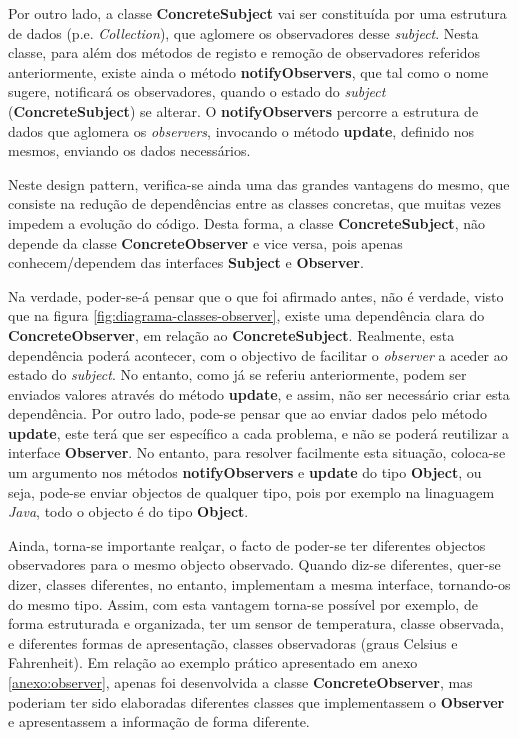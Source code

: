 \hspace{2mm} Por outro lado, a classe \textbf{ConcreteSubject} vai ser constituída por uma estrutura de dados (p.e. \textit{Collection}), que aglomere os observadores desse \textit{subject}. Nesta classe, para além dos métodos de registo e remoção de observadores referidos anteriormente, existe ainda o método \textbf{notifyObservers}, que tal como o nome sugere, notificará os observadores, quando o estado do \textit{subject} (\textbf{ConcreteSubject}) se alterar. O \textbf{notifyObservers} percorre a estrutura de dados que aglomera os \textit{observers}, invocando o método \textbf{update}, definido nos mesmos, enviando os dados necessários.

\hspace{2mm} Neste design pattern, verifica-se ainda uma das grandes vantagens do mesmo, que consiste na redução de dependências entre as classes concretas, que muitas vezes impedem a evolução do código. Desta forma, a classe \textbf{ConcreteSubject}, não depende da classe \textbf{ConcreteObserver} e vice versa, pois apenas conhecem/dependem das interfaces \textbf{Subject} e \textbf{Observer}. 

\hspace{2mm} Na verdade, poder-se-á pensar que o que foi afirmado antes, não é verdade, visto que na figura \ref{fig:diagrama-classes-observer}, existe uma dependência clara do \textbf{ConcreteObserver}, em relação ao \textbf{ConcreteSubject}. Realmente, esta dependência poderá acontecer, com o objectivo de facilitar o \textit{observer} a aceder ao estado do \textit{subject}. No entanto, como já se referiu anteriormente, podem ser enviados valores através do método \textbf{update}, e assim, não ser necessário criar esta dependência. Por outro lado, pode-se pensar que ao enviar dados pelo método \textbf{update}, este terá que ser específico a cada problema, e não se poderá reutilizar a interface \textbf{Observer}. No entanto, para resolver facilmente esta situação, coloca-se um argumento nos métodos \textbf{notifyObservers} e \textbf{update} do tipo \textbf{Object}, ou seja, pode-se enviar objectos de qualquer tipo, pois por exemplo na linaguagem \textit{Java}, todo o objecto é do tipo \textbf{Object}.

\hspace{5mm} Ainda, torna-se importante realçar, o facto de poder-se ter diferentes objectos observadores para o mesmo objecto observado. Quando diz-se diferentes, quer-se dizer, classes diferentes, no entanto, implementam a mesma interface, tornando-os do mesmo tipo. Assim, com esta vantagem torna-se possível por exemplo, de forma estruturada e organizada, ter um sensor de temperatura, classe observada, e diferentes formas de apresentação, classes observadoras (graus Celsius e Fahrenheit). Em relação ao exemplo prático apresentado em anexo \ref{anexo:observer}, apenas foi desenvolvida a classe \textbf{ConcreteObserver}, mas poderiam ter sido elaboradas diferentes classes que implementassem o \textbf{Observer} e apresentassem a informação de forma diferente.

